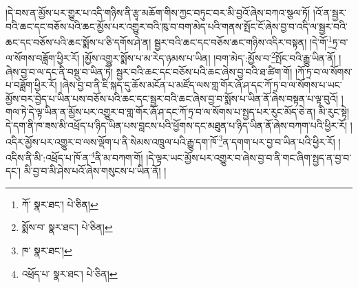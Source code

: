 །དེ་བས་ན་མྱོས་པར་གྱུར་པ་འདི་གཉིས་ནི་རྩྭ་མཆོག་གིས་ཀྱང་བཏུང་བར་མི་བྱའོ་ཞེས་བཀའ་སྩལ་ཏོ། །འོ་ན་སྦྱར་བའི་ཆང་དང་བཅོས་པའི་ཆང་མྱོས་པར་འགྱུར་བའི་ཁུ་བ་བག་མེད་པའི་གནས་སྤོང་ངོ་ཞེས་བྱ་བ་འདི་ལ་སྦྱར་བའི་ཆང་དང་བཅོས་པའི་ཆང་སྨོས་པ་ཅི་དགོས་ཤེ་ན། སྦྱར་བའི་ཆང་དང་བཅོས་ཆང་གཉིས་འདིར་བསྟན། །དེ་གོ་\footnote{ཀོ་  སྣར་ཐང་།  པེ་ཅིན། }ཏྲ་བ་ལ་སོགས་བཟློག་ཕྱིར་རོ། །མྱོས་འགྱུར་སྨོས་པ་མ་རེད་ཉམས་པ་ཡིན། །བག་མེད་:མྱོས་བ་\footnote{སྨོས་བ་  སྣར་ཐང་།  པེ་ཅིན། }སྤོང་བའི་རྒྱུ་ཡིན་ནོ། །ཞེས་བྱ་བ་ལ་དང་ནི་བསྡུ་བ་ཡིན་ཏེ། སྦྱར་བའི་ཆང་དང་བཅོས་པའི་ཆང་ཞེས་བྱ་བའི་ཐ་ཚིག་གོ། །ཀོ་ཏྲ་བ་ལ་སོགས་པ་བཟློག་ཕྱིར་རོ། །ཞེས་བྱ་བ་ནི་ཇི་སྐད་དུ་ཆོས་མངོན་པ་མཛོད་ལས་གླ་གོར་ཞོ་ཤ་དང་ཀོ་ཏྲ་བ་ལ་སོགས་པ་ཡང་མྱོས་བར་བྱེད་པ་ཡིན་པས་བཅོས་པའི་ཆང་དང་སྦྱར་བའི་ཆང་ཞེས་བྱ་བ་སྨོས་པ་ཡིན་ནོ་ཞེས་བསྟན་པ་ལྟ་བུའོ། །གལ་ཏེ་དེ་ལྟ་ཡིན་ན་མྱོས་པར་འགྱུར་བ་གླ་གོར་ཞོ་ཤ་དང་ཀོ་ཏྲ་བ་ལ་སོགས་པ་སྤྱད་པར་རུང་མོད་ཅེ་ན། མི་རུང་སྟེ། དེ་དག་ནི་ཁ་ཟས་མི་འཕྲོད་པ་ཉིད་ཡིན་པས་བླངས་པའི་ཕྱོགས་དང་མཐུན་པ་ཉིད་ཡིན་ནོ་ཞེས་བཀག་པའི་ཕྱིར་རོ། །འདིར་མྱོས་པར་འགྱུར་བ་ལས་ལྡོག་པ་ནི་སེམས་འཁྲུལ་པའི་རྒྱུ་དག་ཁོ་\footnote{ཁ་  སྣར་ཐང་། }ན་དགག་པར་བྱ་བ་ཡིན་པའི་ཕྱིར་རོ། །འདིས་ནི་མི་:འཕྲོད་པ་ཁོ་ན་\footnote{འཕྲོད་པ་  སྣར་ཐང་།  པེ་ཅིན། }ནི་མ་བཀག་གོ། །དེ་ལྟར་ཡང་མྱོས་པར་འགྱུར་བ་ཞེས་བྱ་བ་ནི་གང་ཞིག་སྤྱད་ན་བྱ་བ་དང་། མི་བྱ་བ་མི་ཤེས་པའོ་ཞེས་གསུངས་པ་ཡིན་ནོ། །

